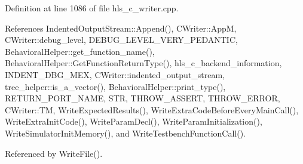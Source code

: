 Definition at line 1086 of file hls\+\_\+c\+\_\+writer.\+cpp.



References Indented\+Output\+Stream\+::\+Append(), C\+Writer\+::\+AppM, C\+Writer\+::debug\+\_\+level, D\+E\+B\+U\+G\+\_\+\+L\+E\+V\+E\+L\+\_\+\+V\+E\+R\+Y\+\_\+\+P\+E\+D\+A\+N\+T\+IC, Behavioral\+Helper\+::get\+\_\+function\+\_\+name(), Behavioral\+Helper\+::\+Get\+Function\+Return\+Type(), hls\+\_\+c\+\_\+backend\+\_\+information, I\+N\+D\+E\+N\+T\+\_\+\+D\+B\+G\+\_\+\+M\+EX, C\+Writer\+::indented\+\_\+output\+\_\+stream, tree\+\_\+helper\+::is\+\_\+a\+\_\+vector(), Behavioral\+Helper\+::print\+\_\+type(), R\+E\+T\+U\+R\+N\+\_\+\+P\+O\+R\+T\+\_\+\+N\+A\+ME, S\+TR, T\+H\+R\+O\+W\+\_\+\+A\+S\+S\+E\+RT, T\+H\+R\+O\+W\+\_\+\+E\+R\+R\+OR, C\+Writer\+::\+TM, Write\+Expected\+Results(), Write\+Extra\+Code\+Before\+Every\+Main\+Call(), Write\+Extra\+Init\+Code(), Write\+Param\+Decl(), Write\+Param\+Initialization(), Write\+Simulator\+Init\+Memory(), and Write\+Testbench\+Function\+Call().



Referenced by Write\+File().

